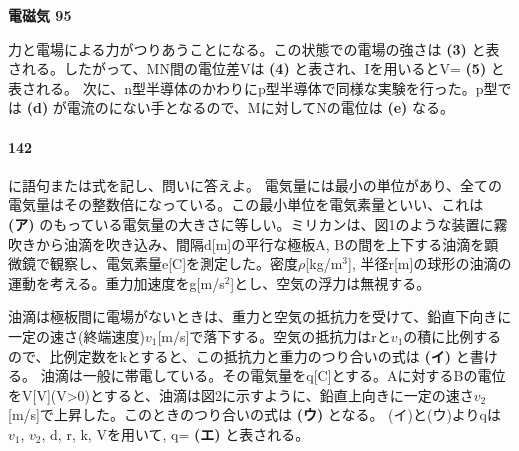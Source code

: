 \documentclass[a4paper, 10pt, dvipdfmx]{bxjsarticle}
\begin{document}
\bigskip

\noindent
\textbf{電磁気 95}

力と電場による力がつりあうことになる。この状態での電場の強さは \textbf{(3)} と表される。したがって、MN間の電位差Vは \textbf{(4)} と表され、Iを用いるとV= \textbf{(5)} と表される。
次に、n型半導体のかわりにp型半導体で同様な実験を行った。p型では \textbf{(d)} が電流のにない手となるので、Mに対してNの電位は \textbf{(e)} なる。

\paragraph{142} \underline{\hspace{2cm}}に語句または式を記し、問いに答えよ。
電気量には最小の単位があり、全ての電気量はその整数倍になっている。この最小単位を電気素量といい、これは \textbf{(ア)} のもっている電気量の大きさに等しい。ミリカンは、図1のような装置に霧吹きから油滴を吹き込み、間隔d[m]の平行な極板A, Bの間を上下する油滴を顕微鏡で観察し、電気素量e[C]を測定した。密度$\rho$[kg/m$^3$], 半径r[m]の球形の油滴の運動を考える。重力加速度をg[m/s$^2$]とし、空気の浮力は無視する。
\begin{center}
     \quad {}
\end{center}
油滴は極板間に電場がないときは、重力と空気の抵抗力を受けて、鉛直下向きに一定の速さ(終端速度)$v_1$[m/s]で落下する。空気の抵抗力はrと$v_1$の積に比例するので、比例定数をkとすると、この抵抗力と重力のつり合いの式は \textbf{(イ)} と書ける。
油滴は一般に帯電している。その電気量をq[C]とする。Aに対するBの電位をV[V](V>0)とすると、油滴は図2に示すように、鉛直上向きに一定の速さ$v_2$[m/s]で上昇した。このときのつり合いの式は \textbf{(ウ)} となる。
(イ)と(ウ)よりqは$v_1$, $v_2$, d, r, k, Vを用いて, q= \textbf{(エ)} と表される。
\end{document}
